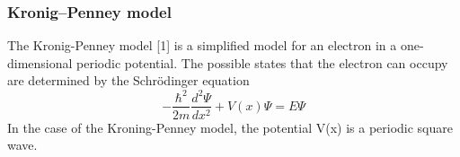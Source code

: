 \subsubsection*{Kronig–Penney model}

The Kronig-Penney model [1] is a simplified model for an electron in a one-dimensional periodic potential. The possible states that the electron can occupy are determined by the Schrödinger equation
\begin{equation}
-\frac{\hbar^2}{2m} \frac{d^2\Psi}{dx^2} + V(x) \Psi = E\Psi
\end{equation}
In the case of the Kroning-Penney model, the potential V(x) is a periodic square wave.